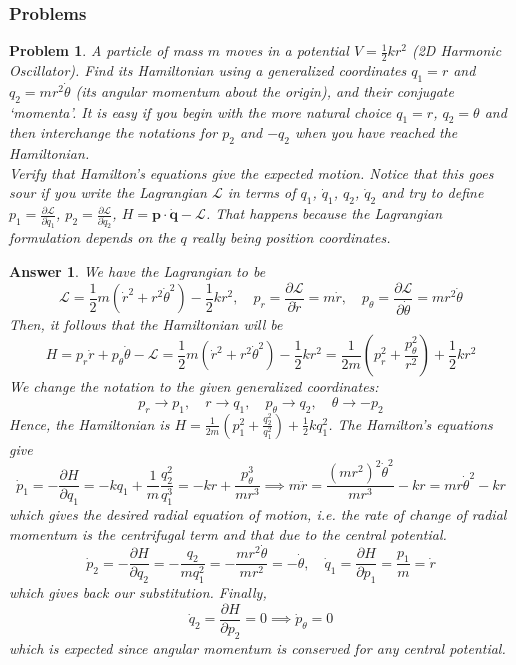 \documentclass[a4paper]{article}
\newtheorem{ans}{Answer}[section]
\theoremstyle{new}
\newtheorem{qns}{Problem}[section]
\begin{document}
\subsubsection{Problems}
\begin{qns}
A particle of mass $m$ moves in a potential $V=\frac{1}{2}kr^2$ (2D Harmonic Oscillator). Find its Hamiltonian using a generalized coordinates $q_1=r$ and $q_2=mr^2\dot{\theta}$ (its angular momentum about the origin), and their conjugate `momenta'. It is easy if you begin with the more natural choice $q_1=r$, $q_2=\theta$ and then interchange the notations for $p_2$ and $-q_2$ when you have reached the Hamiltonian.\\[5pt]
Verify that Hamilton's equations give the expected motion. Notice that this goes sour if you write the Lagrangian $\mathcal{L}$ in terms of $q_1$, $\dot{q}_1$, $q_2$, $\dot{q}_2$ and try to define $p_1=\frac{\partial\mathcal{L}}{\partial\dot{q}_1}$, $p_2=\frac{\partial\mathcal{L}}{\partial\dot{q}_2}$, $H=\mathbf{p}\cdot\mathbf{\dot{q}}-\mathcal{L}$. That happens because the Lagrangian formulation depends on the $q$ really being position coordinates.
\end{qns}
\begin{ans}
We have the Lagrangian to be
$$\mathcal{L}=\frac{1}{2}m(\dot{r}^2+r^2\dot{\theta}^2)-\frac{1}{2}kr^2,\quad p_r=\frac{\partial\mathcal{L}}{\partial\dot{r}}=m\dot{r},\quad p_\theta=\frac{\partial\mathcal{L}}{\partial\dot{\theta}}=mr^2\dot{\theta}$$
Then, it follows that the Hamiltonian will be 
$$H=p_r\dot{r}+p_\theta\dot{\theta}-\mathcal{L}=\frac{1}{2}m(\dot{r}^2+r^2\dot{\theta}^2)-\frac{1}{2}kr^2=\frac{1}{2m}(p_r^2+\frac{p_\theta^2}{r^2})+\frac{1}{2}kr^2$$
We change the notation to the given generalized coordinates:
$$p_r\rightarrow p_1,\quad r\rightarrow q_1,\quad p_\theta\rightarrow q_2,\quad\theta\rightarrow -p_2$$
Hence, the Hamiltonian is $H=\frac{1}{2m}(p_1^2+\frac{q_2^2}{q_1^2})+\frac{1}{2}kq_1^2$. The Hamilton's equations give
$$\dot{p}_1=-\frac{\partial H}{\partial q_1}=-kq_1+\frac{1}{m}\frac{q_2^2}{q_1^3}=-kr+\frac{p_\theta^3}{mr^3}\implies m\ddot{r}=\frac{(mr^2)^2\dot{\theta}^2}{mr^3}-kr=mr\dot{\theta}^2-kr$$
which gives the desired radial equation of motion, i.e. the rate of change of radial momentum is the centrifugal term and that due to the central potential.
$$\dot{p}_2=-\frac{\partial H}{\partial q_2}=-\frac{q_2}{mq_1^2}=-\frac{mr^2\dot{\theta}}{mr^2}=-\dot{\theta},\quad\dot{q}_1=\frac{\partial H}{\partial p_1}=\frac{p_1}{m}=\dot{r}$$
which gives back our substitution. Finally,
$$\dot{q}_2=\frac{\partial H}{\partial p_2}=0\implies\dot{p}_\theta=0$$
which is expected since angular momentum is conserved for any central potential.
\end{ans}
\end{document}
